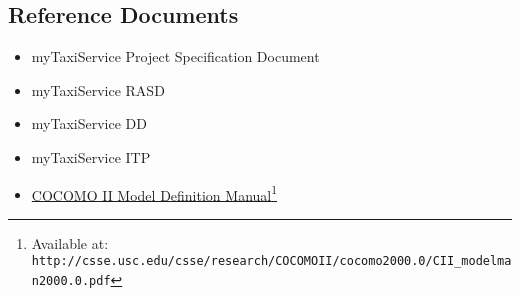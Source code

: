 \subsection{Reference Documents}
\begin{itemize}
	\item myTaxiService Project Specification Document
	\item myTaxiService RASD
	\item myTaxiService DD
	\item myTaxiService ITP
	\item \href{http://csse.usc.edu/csse/research/COCOMOII/cocomo2000.0/CII\_modelman2000.0.pdf}{COCOMO II Model Definition Manual}\footnote{Available at: \texttt{http://csse.usc.edu/csse/research/COCOMOII/cocomo2000.0/CII\_modelman2000.0.pdf}}
\end{itemize}